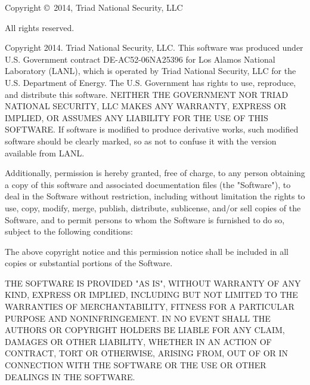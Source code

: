 \documentclass[10pt]{article}
\begin{document}
\begin{flushleft}
\begin{footnotesize}

Copyright \copyright \, 2014, Triad National Security, LLC 

\vspace{5pt}

All rights reserved.

\vspace{5pt}

Copyright 2014. Triad National Security, LLC. This software was produced under U.S. Government contract DE-AC52-06NA25396 for Los Alamos National Laboratory (LANL), which is operated by Triad National Security, LLC for the U.S. Department of Energy. The U.S. Government has rights to use, reproduce, and distribute this software.  NEITHER THE GOVERNMENT NOR TRIAD NATIONAL SECURITY, LLC MAKES ANY WARRANTY, EXPRESS OR IMPLIED, OR ASSUMES ANY LIABILITY FOR THE USE OF THIS SOFTWARE.  If software is modified to produce derivative works, such modified software should be clearly marked, so as not to confuse it with the version available from LANL.

\vspace{5pt}
 
Additionally, permission is hereby granted, free of charge, to any person obtaining a copy of this software and associated documentation files (the "Software"), to deal in the Software without restriction, including without limitation the rights to use, copy, modify, merge, publish, distribute, sublicense, and/or sell copies of the Software, and to permit persons to whom the Software is furnished to do so, subject to the following conditions:
 
 \vspace{5pt}

The above copyright notice and this permission notice shall be included in all copies or substantial portions of the Software.

\vspace{5pt}
 
THE SOFTWARE IS PROVIDED "AS IS", WITHOUT WARRANTY OF ANY KIND, EXPRESS OR IMPLIED, INCLUDING BUT NOT LIMITED TO THE WARRANTIES OF MERCHANTABILITY, FITNESS FOR A PARTICULAR PURPOSE AND NONINFRINGEMENT. IN NO EVENT SHALL THE AUTHORS OR COPYRIGHT HOLDERS BE LIABLE FOR ANY CLAIM, DAMAGES OR OTHER LIABILITY, WHETHER IN AN ACTION OF CONTRACT, TORT OR OTHERWISE, ARISING FROM, OUT OF OR IN CONNECTION WITH THE SOFTWARE OR THE USE OR OTHER DEALINGS IN THE SOFTWARE.
 
 \end{footnotesize}
\end{flushleft} 
\end{document}
